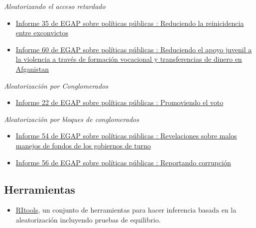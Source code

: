 \documentclass[12pt,spanish,]{book}
\providecommand{\tightlist}{%
  \setlength{\itemsep}{0pt}\setlength{\parskip}{0pt}}
\begin{document}
\emph{Aleatorizando el acceso retardado}

\begin{itemize}
\item
  \href{https://egap.org/resource/brief-35-reducing-reconvictions-among-released-prisoners/}{Informe 35 de EGAP sobre políticas públicas : Reduciendo la reinicidencia entre exconvictos}
\item
  \href{https://egap.org/resource/reducing-youth-support-for-violence-through-training-and-cash-transfers-in-afghanistan/}{Informe 60 de EGAP sobre políticas públicas : Reduciendo el apoyo juvenil a la violencia a través de formación vocacional y transferencias de dinero en Afganistan}
\end{itemize}

\emph{Aleatorización por Conglomerados}

\begin{itemize}
\tightlist
\item
  \href{https://egap.org/resource/brief-22-getting-out-the-vote/}{Informe 22 de EGAP sobre políticas públicas : Promoviendo el voto}
\end{itemize}

\emph{Aleatorización por bloques de conglomerados}

\begin{itemize}
\item
  \href{https://egap.org/resource/evidence-from-mexico-the-effect-of-incumbent-malfeasance-revelations/}{Informe 54 de EGAP sobre políticas públicas : Revelaciones sobre malos manejos de fondos de los gobiernos de turno}
\item
  \href{https://egap.org/resource/reporting-corruption-in-nigeria-testing-the-effects-of-norms-nudges/}{Informe 56 de EGAP sobre políticas públicas : Reportando corrupción}
\end{itemize}

\hypertarget{herramientas-1}{%
\subsection{Herramientas}\label{herramientas-1}}

\begin{itemize}
\tightlist
\item
  \href{https://cran.r-project.org/web/packages/RItools/index.html}{RItools}, un conjunto de herramientas para hacer inferencia basada en la aleatorización incluyendo pruebas de equilibrio.
\end{itemize}
\end{document}
